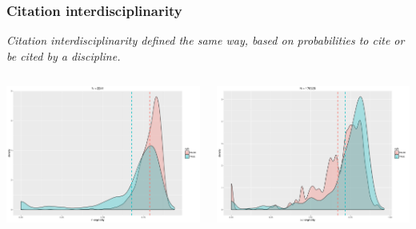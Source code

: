 \begin{frame}
\end{frame}


\begin{frame}
\frametitle{Citation interdisciplinarity}

\textit{Citation interdisciplinarity defined the same way, based on probabilities to cite or be cited by a discipline.}

\begin{columns}
\begin{column}{0.5\textwidth}
\includegraphics[width=\textwidth]{figures/citin_interdisc}
\textit{}
\end{column}
\begin{column}{0.5\textwidth}
\includegraphics[width=\textwidth]{figures/citout_interdisc}
\end{column}
\end{columns}
\end{frame}



